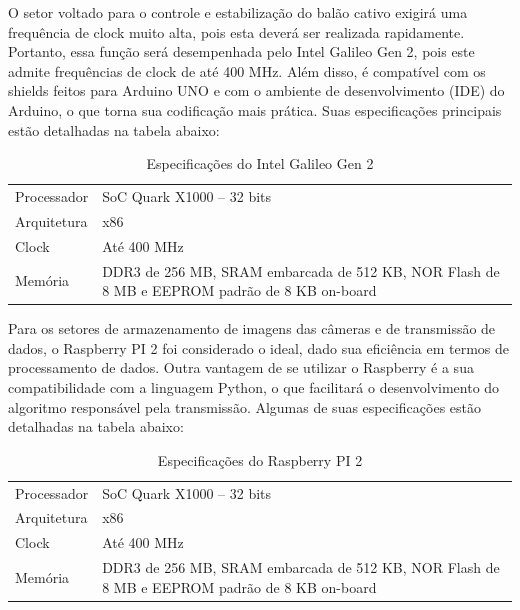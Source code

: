 	O setor voltado para o controle e estabilização do balão cativo exigirá uma frequência de clock muito alta, pois esta deverá ser realizada rapidamente. Portanto,  essa função será desempenhada pelo Intel Galileo Gen 2, pois este admite frequências de clock de até 400 MHz. Além disso, é compatível com os shields feitos para Arduino UNO e com o ambiente de desenvolvimento (IDE) do Arduino, o que torna sua codificação mais prática. Suas especificações principais estão detalhadas na tabela abaixo:

	\begin{table}[]
		\centering
		\begin{tabular}{ll}
			Processador & SoC Quark X1000 – 32 bits                                                                    \\
			Arquitetura & x86                                                                                          \\
			Clock       & Até 400 MHz                                                                                  \\
			Memória     & DDR3 de 256 MB, SRAM embarcada de 512 KB, NOR Flash de 8 MB e EEPROM padrão de 8 KB on-board
		\end{tabular}
		\caption{Especificações do Intel Galileo Gen 2}
		\label{tab:galileu}
	\end{table}

	Para os setores de armazenamento de imagens das câmeras e de transmissão de dados, o Raspberry PI 2 foi considerado o ideal, dado sua eficiência em termos de processamento de dados. Outra vantagem de se utilizar o Raspberry é a sua compatibilidade com a linguagem Python, o que facilitará o desenvolvimento do algoritmo responsável pela transmissão. Algumas de suas especificações estão detalhadas na tabela abaixo:

	\begin{table}[]
		\centering
		\begin{tabular}{ll}
			Processador & SoC Quark X1000 – 32 bits                                                                    \\
			Arquitetura & x86                                                                                          \\
			Clock       & Até 400 MHz                                                                                  \\
			Memória     & DDR3 de 256 MB, SRAM embarcada de 512 KB, NOR Flash de 8 MB e EEPROM padrão de 8 KB on-board
		\end{tabular}
		\caption{Especificações do Raspberry PI 2}
		\label{tab:rasperry}
	\end{table}

